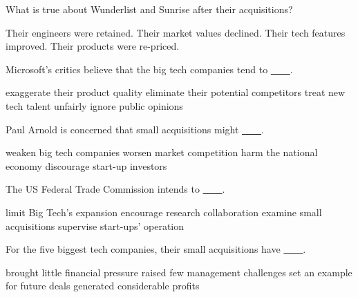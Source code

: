\item What is true about Wunderlist and Sunrise after their acquisitions?
\begin{tasks}
	\task Their engineers were retained.
	\task Their market values declined.
	\task Their tech features improved.
	\task Their products were re-priced.
\end{tasks}
\item Microsoft's critics believe that the big tech companies tend to \uline{~~~~}.
\begin{tasks}
	\task exaggerate their product quality
	\task eliminate their potential competitors
	\task treat new tech talent unfairly
	\task ignore public opinions
\end{tasks}
\item Paul Arnold is concerned that small acquisitions might \uline{~~~~}.
\begin{tasks}
	\task weaken big tech companies
	\task worsen market competition
	\task harm the national economy
	\task discourage start-up investors
\end{tasks}
\item The US Federal Trade Commission intends to \uline{~~~~}.
\begin{tasks}
	\task limit Big Tech's expansion
	\task encourage research collaboration
	\task examine small acquisitions
	\task supervise start-ups' operation
\end{tasks}
\item For the five biggest tech companies, their small acquisitions have \uline{~~~~}.
\begin{tasks}
	\task brought little financial pressure
	\task raised few management challenges
	\task set an example for future deals
	\task generated considerable profits
\end{tasks}